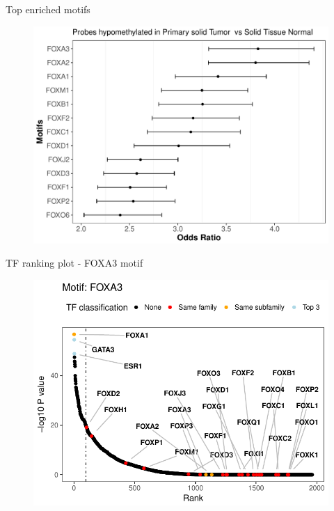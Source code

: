 \documentclass[slidestop,compress,11pt,xcolor=dvipsnames]{beamer}
\begin{document}
\begin{frame}{Top enriched motifs}
 \vspace*{-0.3cm}
 \begin{figure}
  \centering
  \includegraphics[width=0.9\linewidth]{ELMER/motif_new.pdf}
 \end{figure}
\end{frame}


\begin{frame}{TF ranking plot - FOXA3 motif}
 \vspace*{-0.3cm}
 \begin{figure}
  \centering
  \includegraphics[width=0.9\linewidth]{ELMER/TF_raking.pdf}
 \end{figure}
\end{frame}
\end{document}
